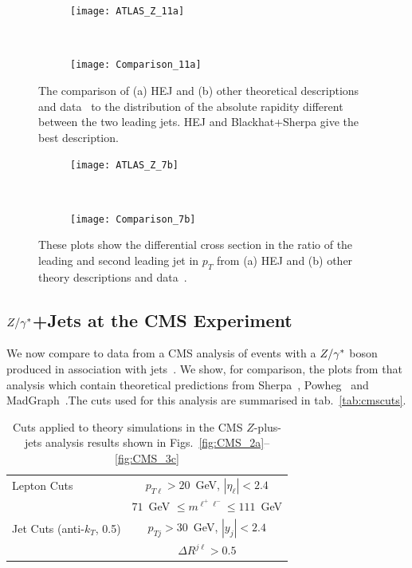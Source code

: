 			\begin{figure}[h]
			  \centering
			  \begin{subfigure}[b]{0.48\textwidth}
			    \texttt{[image: ATLAS\_Z\_11a]}
			    \caption{}
			    \label{fig:HEJ_ATLAS_11a}
			  \end{subfigure}
			  ~
			  \begin{subfigure}[b]{0.48\textwidth}
			    \texttt{[image: Comparison\_11a]}
			    \caption{}
			    \label{fig:MC_ATLAS_11a}
			  \end{subfigure}
			  \caption{The comparison of (a) HEJ and (b) other theoretical descriptions and
			    data~\cite{Aad:2013ysa} to
			    the distribution of the absolute rapidity different between the two leading
			    jets.  HEJ and Blackhat+Sherpa give the best description.}
			  \label{fig:ATLAS_11a}

			  \begin{subfigure}[b]{0.48\textwidth}
			    \texttt{[image: ATLAS\_Z\_7b]}
			    \caption{}
			    \label{fig:HEJ_ATLAS_7b}
			  \end{subfigure}
			  ~
			  \begin{subfigure}[b]{0.48\textwidth}
			    \texttt{[image: Comparison\_7b]}
			    \caption{}
			    \label{fig:MC_ATLAS_7b}
			  \end{subfigure}
			  \caption{These plots show the differential cross section in the ratio of the leading
			     and second leading jet in $p_T$ from (a) HEJ and (b) other
			    theory descriptions and data~\cite{Aad:2013ysa}.}
			  \label{fig:ATLAS_7b}
			\end{figure}

		\subsection{$Z/\gamma^*$+Jets at the CMS Experiment}
			\label{sub:CMS}

			We now compare to data from a CMS analysis of events with a $Z/\gamma^*$ boson produced
			in association with jets~\cite{Khachatryan:2014zya}.  We show, for comparison,
			the plots from that analysis which contain theoretical predictions from
			Sherpa~\cite{Gleisberg:2008ta,Hoeche:2012yf}, Powheg~\cite{Alioli:2010qp} and
			MadGraph~\cite{Alwall:2014hca}.The cuts used for this analysis are summarised in
			tab.~\eqref{tab:cmscuts}.

			\begin{table}[hbt]
			  \centering
			  \begin{tabular}{|l|c|}
			    \hline
			    Lepton Cuts & $p_{T\ell}>20$~GeV, \; $|\eta_\ell|<2.4$ \\
			    &\; $71$~GeV $\leq m^{\ell^+\ell^-} \leq
			      111$~GeV \\ \hline
			    Jet Cuts (anti-$k_T$, 0.5) & $p_{Tj}>30$~GeV, \; $|y_j|<2.4$ \\
			    & $\Delta R^{j\ell} >0.5$ \\
			\hline
			  \end{tabular}
			  \caption{Cuts applied to theory simulations in the CMS
			    $Z$-plus-jets analysis results shown in
			    Figs.~\eqref{fig:CMS_2a}--\eqref{fig:CMS_3c}}
			  \label{tab:cmscuts}
			\end{table}

